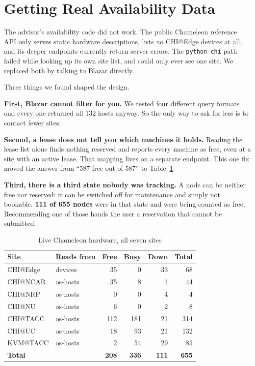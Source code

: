 \documentclass[conference]{IEEEtran}
\begin{document}
\section{Getting Real Availability Data}

The advisor's availability code did not work. The public Chameleon reference
API only serves static hardware descriptions, lists no CHI@Edge devices at all,
and its deeper endpoints currently return server errors. The
\texttt{python-chi} path failed while looking up its own site list, and could
only ever see one site. We replaced both by talking to Blazar directly.

Three things we found shaped the design.

\textbf{First, Blazar cannot filter for you.} We tested four different query
formats and every one returned all 132 hosts anyway. So the only way to ask for
less is to contact fewer sites.

\textbf{Second, a lease does not tell you which machines it holds.} Reading the
lease list alone finds nothing reserved and reports every machine as free, even
at a site with an active lease. That mapping lives on a separate endpoint. This
one fix moved the answer from ``587 free out of 587'' to
Table~\ref{tab:fleet}.

\textbf{Third, there is a third state nobody was tracking.} A node can be
neither free nor reserved: it can be switched off for maintenance and simply
not bookable. \textbf{111 of 655 nodes} were in that state and were being
counted as free. Recommending one of those hands the user a reservation that
cannot be submitted.

\begin{table}[h]
\caption{Live Chameleon hardware, all seven sites}
\label{tab:fleet}
\centering\footnotesize
\begin{tabular}{@{}llrrrr@{}}
\toprule
Site & Reads from & Free & Busy & Down & Total \\
\midrule
CHI@Edge  & devices  & 35  & 0   & 33  & 68  \\
CHI@NCAR  & os-hosts & 35  & 8   & 1   & 44  \\
CHI@NRP   & os-hosts & 0   & 0   & 4   & 4   \\
CHI@NU    & os-hosts & 6   & 0   & 2   & 8   \\
CHI@TACC  & os-hosts & 112 & 181 & 21  & 314 \\
CHI@UC    & os-hosts & 18  & 93  & 21  & 132 \\
KVM@TACC  & os-hosts & 2   & 54  & 29  & 85  \\
\midrule
\textbf{Total} & & \textbf{208} & \textbf{336} & \textbf{111} & \textbf{655} \\
\bottomrule
\end{tabular}
\end{table}
\end{document}
